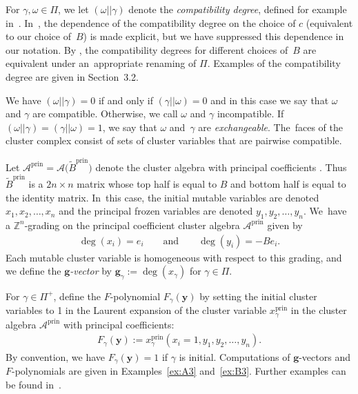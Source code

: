 \documentclass[10pt,a4paper]{amsart}
\def\Z{{\mathbb Z}}
\def\A{{\mathcal{A}}}
\def\prin{{\operatorname{prin}}}
\def\tB{{\tilde B}}
\def\tB{{\tilde B}}
\def\y{{\mathbf y}}
\def\g{{\mathbf g}}
\numberwithin{equation}{section}
\begin{document}
\bigskip{} %
For $\gamma,\omega \in \Pi$, we let $(\omega||\gamma)$ denote the \emph{compatibility degree}, defined for example in~\cite[Proposition~5.1]{YZ}. In~\cite{YZ}, the dependence of the compatibility degree on the choice of $c$ (equivalent to our choice of~$B$) is made explicit, but we have suppressed this dependence in our notation. By \cite[Section~5]{YZ}, the compatibility degrees for different choices of~$B$ are equivalent under an~appropriate renaming of $\Pi$. Examples of the compatibility degree are given in Section~3.2.

We have $(\omega||\gamma) = 0$ if and only if $(\gamma||\omega) = 0$ and in this case we say that $\omega$ and $\gamma$ are compatible. Otherwise, we call $\omega$ and $\gamma$ incompatible. If~$(\omega||\gamma) = (\gamma||\omega) = 1$, we say that $\omega$ and~$\gamma$ are {\it exchangeable}. The~faces of the cluster complex consist of sets of cluster variables that are pairwise compatible.

\bigskip{}
Let $\A^{\prin} = \A\big(\tB^\prin\big)$ denote the cluster algebra with principal coefficients \cite{CA4}. Thus $\tB^{\prin}$ is a $2n \times n$ matrix whose top half is equal to $B$ and bottom half is equal to the identity matrix. In~this case, the initial mutable variables are denoted $x_1,x_2,\dots,x_n$ and the principal frozen variables are denoted $y_1,y_2,\dots,y_n$. We~have a $\Z^n$-grading on
the principal coefficient cluster algebra $\A^\prin$ given by
\begin{gather}\label{eq:prindeg}
\deg(x_i) = e_i \qquad \text{and} \qquad \deg(y_i) = -B e_i.
\end{gather}
Each mutable cluster variable is homogeneous with respect to this grading, and we define the \emph{$\g$-vector} by $\g_\gamma := \deg(x_\gamma)$ for $\gamma \in \Pi$.

\bigskip{}
For $\gamma \in \Pi^+$, define the $F$-polynomial $F_\gamma(\y)$ by setting the initial cluster variables to 1 in the Laurent expansion of the cluster variable $x^\prin_\gamma$ in the cluster algebra $\A^\prin$ with principal coefficients:
\begin{gather*}
F_\gamma(\y) := x^\prin_\gamma(x_i = 1, y_1,y_2,\dots,y_n).
\end{gather*}
By convention, we have $F_\gamma(\y) = 1$ if $\gamma$ is initial. Computations of $\g$-vectors and $F$-polynomials are given in Examples~\ref{ex:A3} and~\ref{ex:B3}. Further examples can be found in~\cite{BDMTY,CA4}.
\end{document}
